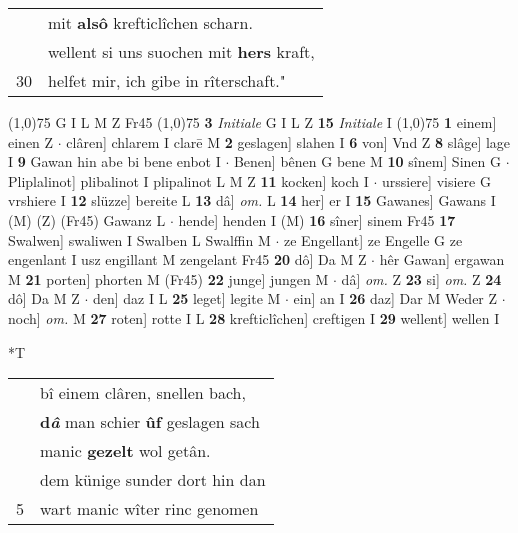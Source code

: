 \documentclass[8pt,a4paper,notitlepage]{article}
\begin{document}
\begin{table}[ht]
\begin{minipage}[t]{0.5\linewidth}
\begin{tabular}{rl}
 & mit \textbf{alsô} krefticlîchen scharn.\\ 
 & wellent si uns suochen mit \textbf{hers} kraft,\\ 
30 & helfet mir, ich gibe in rîterschaft."\\ 
\end{tabular}
\scriptsize
\line(1,0){75} \newline
G I L M Z Fr45 \newline
\line(1,0){75} \newline
\textbf{3} \textit{Initiale} G I L Z  \textbf{15} \textit{Initiale} I  \newline
\line(1,0){75} \newline
\textbf{1} einem] einen Z  $\cdot$ clâren] chlarem I clarē M \textbf{2} geslagen] slahen I \textbf{6} von] Vnd Z \textbf{8} slâge] lage I \textbf{9} Gawan hin abe bi bene enbot I  $\cdot$ Benen] bênen G bene M \textbf{10} sînem] Sinen G  $\cdot$ Pliplalinot] plibalinot I plipalinot L M Z \textbf{11} kocken] koch I  $\cdot$ urssiere] visiere G vrshiere I \textbf{12} slüzze] bereite L \textbf{13} dâ] \textit{om.} L \textbf{14} her] er I \textbf{15} Gawanes] Gawans I (M) (Z) (Fr45) Gawanz L  $\cdot$ hende] henden I (M) \textbf{16} sîner] sinem Fr45 \textbf{17} Swalwen] swaliwen I Swalben L Swalffin M  $\cdot$ ze Engellant] ze Engelle G ze engenlant I usz engillant M zengelant Fr45 \textbf{20} dô] Da M Z  $\cdot$ hêr Gawan] ergawan M \textbf{21} porten] phorten M (Fr45) \textbf{22} junge] jungen M  $\cdot$ dâ] \textit{om.} Z \textbf{23} si] \textit{om.} Z \textbf{24} dô] Da M Z  $\cdot$ den] daz I L \textbf{25} leget] legite M  $\cdot$ ein] an I \textbf{26} daz] Dar M Weder Z  $\cdot$ noch] \textit{om.} M \textbf{27} roten] rotte I L \textbf{28} krefticlîchen] creftigen I \textbf{29} wellent] wellen I \newline
\end{minipage}
\hspace{0.5cm}
\begin{minipage}[t]{0.5\linewidth}
\small
\begin{center}*T
\end{center}
\begin{tabular}{rl}
 & bî einem clâren, snellen bach,\\ 
 & \textbf{d\textit{â}} man schier \textbf{ûf} geslagen sach\\ 
 & manic \textbf{gezelt} wol getân.\\ 
 & dem künige sunder dort hin dan\\ 
5 & wart manic wîter rinc genomen\\ 

\end{tabular}
\end{minipage}
\end{table}
\end{document}
